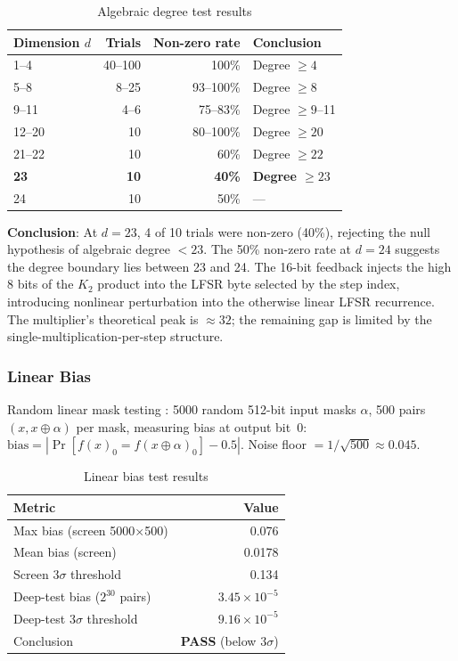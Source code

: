 \documentclass[11pt,a4paper]{article}
\begin{document}
\begin{table}[H]
\centering
\begin{tabular}{@{}lrrl@{}}
\toprule
\textbf{Dimension $d$} & \textbf{Trials} & \textbf{Non-zero rate} & \textbf{Conclusion} \\
\midrule
1--4  & 40--100 & 100\% & Degree $\ge 4$ \\
5--8  & 8--25   & 93--100\% & Degree $\ge 8$ \\
9--11 & 4--6    & 75--83\%  & Degree $\ge 9$--11 \\
12--20 & 10     & 80--100\% & Degree $\ge 20$ \\
21--22 & 10     & 60\% & Degree $\ge 22$ \\
\textbf{23} & \textbf{10} & \textbf{40\%} & \textbf{Degree $\ge 23$} \\
24    & 10     & 50\% & --- \\
\bottomrule
\end{tabular}
\caption{Algebraic degree test results}
\label{tab:degree}
\end{table}

\textbf{Conclusion}: At $d=23$, 4 of 10 trials were non-zero (40\%), rejecting
the null hypothesis of algebraic degree $<23$. The 50\% non-zero rate at
$d=24$ suggests the degree boundary lies between 23 and 24. The 16-bit feedback
injects the high 8 bits of the $K_2$ product into the LFSR byte selected by the
step index, introducing nonlinear perturbation into the otherwise linear LFSR
recurrence. The multiplier's theoretical peak is $\approx 32$; the remaining
gap is limited by the single-multiplication-per-step structure.

\subsubsection{Linear Bias}

Random linear mask testing \cite{matsui}: 5000 random 512-bit input masks
$\alpha$, 500 pairs $(x, x\oplus\alpha)$ per mask, measuring bias at output
bit~0: $\mathrm{bias} = |\Pr[f(x)_0 = f(x\oplus\alpha)_0] - 0.5|$.
Noise floor $= 1/\sqrt{500} \approx 0.045$.

\begin{table}[H]
\centering
\begin{tabular}{@{}lr@{}}
\toprule
\textbf{Metric} & \textbf{Value} \\
\midrule
Max bias (screen 5000$\times$500) & 0.076 \\
Mean bias (screen)               & 0.0178 \\
Screen $3\sigma$ threshold       & 0.134 \\
Deep-test bias ($2^{30}$ pairs)  & \textbf{$3.45{\times}10^{-5}$} \\
Deep-test $3\sigma$ threshold     & $9.16{\times}10^{-5}$ \\
Conclusion                        & \textbf{PASS} (below $3\sigma$) \\
\bottomrule
\end{tabular}
\caption{Linear bias test results}
\label{tab:linear}
\end{table}
\end{document}
